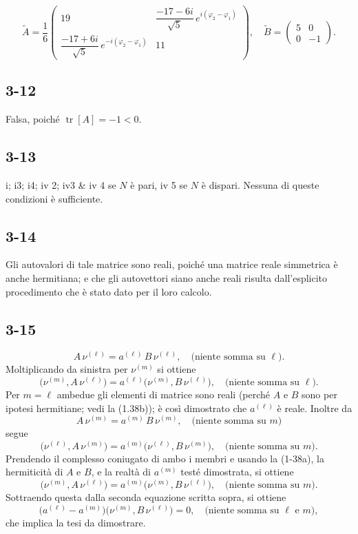 \documentclass[11pt, a4paper]{book}
\numberwithin{equation}{section}
\begin{document}
\[
\widetilde{A} = \frac{1}{6}
\begin{pmatrix}
19 & \dfrac{-17-6i}{\sqrt{5}}\,e^{i(\varphi_2-\varphi_1)} \\[6pt]
\dfrac{-17+6i}{\sqrt{5}}\,e^{-i(\varphi_2-\varphi_1)} & 11
\end{pmatrix},
\quad
\widetilde{B} = \begin{pmatrix} 5 & 0 \\ 0 & -1 \end{pmatrix}.
\]

\subsection*{3-12}
Falsa, poiché $\operatorname{tr}[A] = -1 < 0$.

\subsection*{3-13}
i; i3; i4; iv 2; iv3 \& iv 4 se $N$ è pari, iv 5 se $N$ è dispari.
Nessuna di queste condizioni è sufficiente.

\subsection*{3-14}
Gli autovalori di tale matrice sono reali, poiché una matrice reale
simmetrica è anche hermitiana; e che gli autovettori siano anche reali
risulta dall'esplicito procedimento che è stato dato per il loro calcolo.

\subsection*{3-15}
\[
A\,\nu^{(\ell)} = a^{(\ell)}\,B\,\nu^{(\ell)},
\quad \text{(niente somma su }\ell\text{)}.
\]
Moltiplicando da sinistra per $\nu^{(m)}$ si ottiene
\[
\bigl(\nu^{(m)}, A\,\nu^{(\ell)}\bigr)
= a^{(\ell)}\bigl(\nu^{(m)}, B\,\nu^{(\ell)}\bigr),
\quad \text{(niente somma su }\ell\text{)}.
\]
Per $m=\ell$ ambedue gli elementi di matrice sono reali (perché $A$ e $B$
sono per ipotesi hermitiane; vedi la (1.38b)); è così dimostrato che
$a^{(\ell)}$ è reale. Inoltre da
\[
A\,\nu^{(m)} = a^{(m)}\,B\,\nu^{(m)},
\quad \text{(niente somma su }m\text{)}
\]
segue
\[
\bigl(\nu^{(\ell)}, A\,\nu^{(m)}\bigr)
= a^{(m)}\bigl(\nu^{(\ell)}, B\,\nu^{(m)}\bigr),
\quad \text{(niente somma su }m\text{)}.
\]
Prendendo il complesso coniugato di ambo i membri e usando la (1-38a),
la hermiticità di $A$ e $B$, e la realtà di $a^{(m)}$ testé dimostrata,
si ottiene
\[
\bigl(\nu^{(m)}, A\,\nu^{(\ell)}\bigr)
= a^{(m)}\bigl(\nu^{(m)}, B\,\nu^{(\ell)}\bigr),
\quad \text{(niente somma su }m\text{)}.
\]
Sottraendo questa dalla seconda equazione scritta sopra, si ottiene
\[
\bigl(a^{(\ell)}-a^{(m)}\bigr)\bigl(\nu^{(m)}, B\,\nu^{(\ell)}\bigr) = 0,
\quad \text{(niente somma su }\ell\text{ e }m\text{)},
\]
che implica la tesi da dimostrare.
\end{document}
